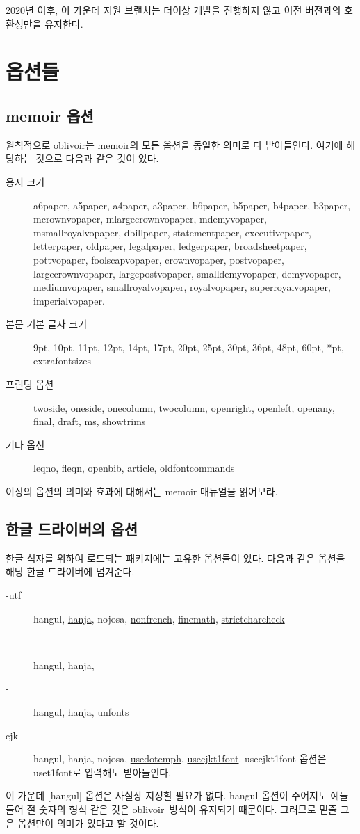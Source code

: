 \documentclass[
	12pt,
	a4paper,
	kosection,
	footnote,
	nobookmarks,
	microtype,
]{oblivoir}
\newcommand\obclass{ob\-liv\-oir\oblivoirallowbreak}
\begin{document}
2020년 이후, 이 가운데  지원 브랜치는 더이상 개발을 진행하지 않고
이전 버전과의 호환성만을 유지한다.

\section{옵션들}

\subsection{memoir 옵션}

원칙적으로 oblivoir는 memoir의 모든 옵션을 동일한 의미로 다 받아들인다. 여기에 해당하는 것으로 
다음과 같은 것이 있다. 
\begin{description}
\item[용지 크기] a6paper, a5paper, a4paper, a3paper, b6paper, b5paper, b4paper, b3paper, mcrownvopaper, mlargecrownvopaper, mdemyvopaper, msmallroyalvopaper, dbillpaper, statementpaper, executivepaper, letterpaper, oldpaper, legalpaper, ledgerpaper, broadsheetpaper, pottvopaper, foolscapvopaper, crownvopaper, postvopaper, largecrownvopaper, largepostvopaper, smalldemyvopaper, demyvopaper, mediumvopaper, smallroyalvopaper, royalvopaper, superroyalvopaper, imperialvopaper.
\item[본문 기본 글자 크기] 9pt, 10pt, 11pt, 12pt, 14pt, 17pt, 20pt, 25pt, 30pt, 36pt, 48pt, 60pt, *pt, extrafontsizes
\item[프린팅 옵션] twoside, oneside, onecolumn, twocolumn, openright, openleft, openany, final, draft,
ms, showtrims
\item[기타 옵션] leqno, fleqn, openbib, article, oldfontcommands
\end{description}
이상의 옵션의 의미와 효과에 대해서는 memoir 매뉴얼을 읽어보라.

\subsection{한글 드라이버의 옵션}

한글 식자를 위하여 로드되는 패키지에는 고유한 옵션들이 있다.  다음과 같은 옵션을 해당
한글 드라이버에 넘겨준다.

\begin{description}
\item [\koTeX-utf] hangul, \uline{hanja}, nojosa, \uline{nonfrench}, \uline{finemath}, \uline{strictcharcheck}
\item [\XeTeX-\ko] hangul, hanja, %
\item [\LuaTeX-\ko] hangul, hanja, unfonts
\item [cjk-\ko] hangul, hanja, nojosa, \uline{usedotemph}, \uline{usecjkt1font}. usecjkt1font 옵션은 uset1font로 입력해도 받아들인다.
\end{description}
이 가운데 [hangul] 옵션은 사실상 지정할 필요가 없다. hangul 옵션이 주어져도 예들 들어 절 숫자의 형식 같은 것은 \obclass\ 방식이 유지되기 때문이다. 그러므로 밑줄 그은 옵션만이  의미가 있다고 할 것이다.
\end{document}
